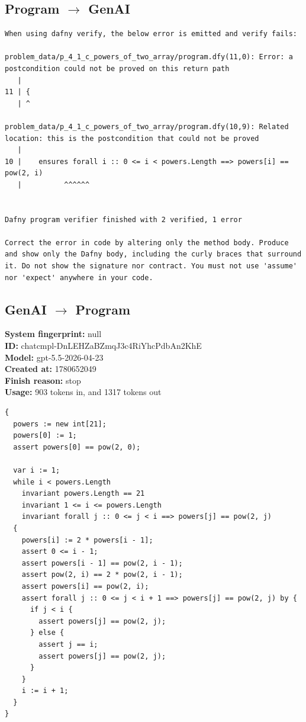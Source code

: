 \documentclass{article}
\begin{document}
\subsection*{Program $\rightarrow$ GenAI}
\begin{lstlisting}
When using dafny verify, the below error is emitted and verify fails:

problem_data/p_4_1_c_powers_of_two_array/program.dfy(11,0): Error: a postcondition could not be proved on this return path
   |
11 | {
   | ^

problem_data/p_4_1_c_powers_of_two_array/program.dfy(10,9): Related location: this is the postcondition that could not be proved
   |
10 | 	ensures forall i :: 0 <= i < powers.Length ==> powers[i] == pow(2, i)
   |          ^^^^^^


Dafny program verifier finished with 2 verified, 1 error

Correct the error in code by altering only the method body. Produce and show only the Dafny body, including the curly braces that surround it. Do not show the signature nor contract. You must not use 'assume' nor 'expect' anywhere in your code.
\end{lstlisting}
\subsection*{GenAI $\rightarrow$ Program}
\textbf{System fingerprint: }null
\\\textbf{ID: }chatcmpl-DnLEHZaBZmqJ3c4RiYhcPdbAn2KhE
\\\textbf{Model: }gpt-5.5-2026-04-23
\\\textbf{Created at: }1780652049
\\\textbf{Finish reason: }stop
\\\textbf{Usage: }903 tokens in, and 1317 tokens out
\begin{lstlisting}
{
  powers := new int[21];
  powers[0] := 1;
  assert powers[0] == pow(2, 0);

  var i := 1;
  while i < powers.Length
    invariant powers.Length == 21
    invariant 1 <= i <= powers.Length
    invariant forall j :: 0 <= j < i ==> powers[j] == pow(2, j)
  {
    powers[i] := 2 * powers[i - 1];
    assert 0 <= i - 1;
    assert powers[i - 1] == pow(2, i - 1);
    assert pow(2, i) == 2 * pow(2, i - 1);
    assert powers[i] == pow(2, i);
    assert forall j :: 0 <= j < i + 1 ==> powers[j] == pow(2, j) by {
      if j < i {
        assert powers[j] == pow(2, j);
      } else {
        assert j == i;
        assert powers[j] == pow(2, j);
      }
    }
    i := i + 1;
  }
}
\end{lstlisting}
\end{document}
